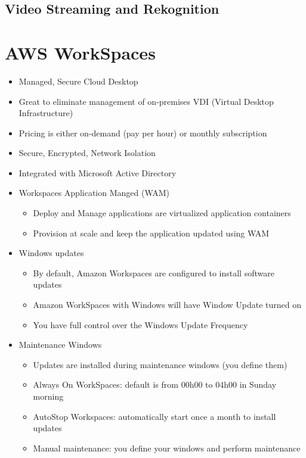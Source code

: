 \subsection{Video Streaming and Rekognition}


\section{AWS WorkSpaces}
\begin{itemize}
    \item Managed, Secure Cloud Desktop
    \item Great to eliminate management of on-premises VDI (Virtual Desktop Infrastructure)
    \item Pricing is either on-demand (pay per hour) or monthly subscription
    \item Secure, Encrypted, Network Isolation
    \item Integrated with Microsoft Active Directory
\end{itemize}

\begin{itemize}
    \item Workspaces Application Manged (WAM)
    \begin{itemize}
        \item Deploy and Manage applications are virtualized application containers
        \item Provision at scale and keep the application updated using WAM
    \end{itemize}
    \item Windows updates
    \begin{itemize}
        \item By default, Amazon Workspaces are configured to install software updates
        \item Amazon WorkSpaces with Windows will have Window Update turned on
        \item You have full control over the Windows Update Frequency
    \end{itemize}
    \item Maintenance Windows
    \begin{itemize}
        \item Updates are installed during maintenance windows (you define them)
        \item Always On WorkSpaces: default is from 00h00 to 04h00 in Sunday morning
        \item AutoStop Workspaces: automatically start once a month to install updates
        \item Manual maintenance: you define your windows and perform maintenance
    \end{itemize}
\end{itemize}

